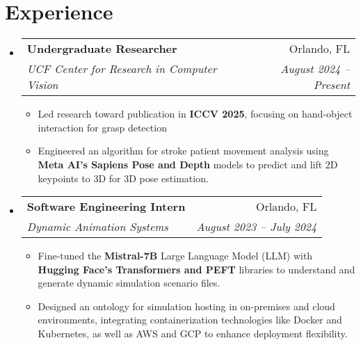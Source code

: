 \documentclass[letterpaper,11pt]{article}
\makeatletter
\newcommand{\resumeItem}[1]{
  \item\small{
    {#1 \vspace{-2pt}}
  }
}
\newcommand{\resumeSubheading}[4]{
  \vspace{-2pt}\item
    \begin{tabular*}{0.97\textwidth}[t]{l@{\extracolsep{\fill}}r}
      \textbf{#1} & #2 \\
      \textit{\small#3} & \textit{\small #4} \\
    \end{tabular*}\vspace{-7pt}
}
\newcommand{\resumeSubHeadingListStart}{\begin{itemize}[leftmargin=0.15in, label={}]}
\newcommand{\resumeSubHeadingListEnd}{\end{itemize}}
\newcommand{\resumeItemListStart}{\begin{itemize}}
\newcommand{\resumeItemListEnd}{\end{itemize}\vspace{-5pt}}
\makeatother
\begin{document}
\section{Experience}
  \resumeSubHeadingListStart
    \resumeSubheading
      {Undergraduate Researcher}{Orlando, FL}
      {UCF Center for Research in Computer Vision}{August 2024 -- Present}
      \resumeItemListStart
        \resumeItem{Led research toward publication in \textbf{ICCV 2025}, focusing on hand-object interaction for grasp detection}
        \resumeItem{Engineered an algorithm for stroke patient movement analysis using \textbf{Meta AI's Sapiens Pose and Depth} models to predict and lift 2D keypoints to 3D for 3D pose estimation.}
      \resumeItemListEnd
    \resumeSubheading
      {Software Engineering Intern}{Orlando, FL}
      {Dynamic Animation Systems}{August 2023 -- July 2024}
      \resumeItemListStart
        \resumeItem{Fine-tuned the \textbf{Mistral-7B} Large Language Model (LLM) with \textbf{Hugging Face's Transformers and PEFT} libraries to understand and generate dynamic simulation scenario files.}
        \resumeItem{Designed an ontology for simulation hosting in on-premises and cloud environments, integrating containerization technologies like Docker and Kubernetes, as well as AWS and GCP to enhance deployment flexibility.}
      \resumeItemListEnd
  \resumeSubHeadingListEnd
\end{document}
